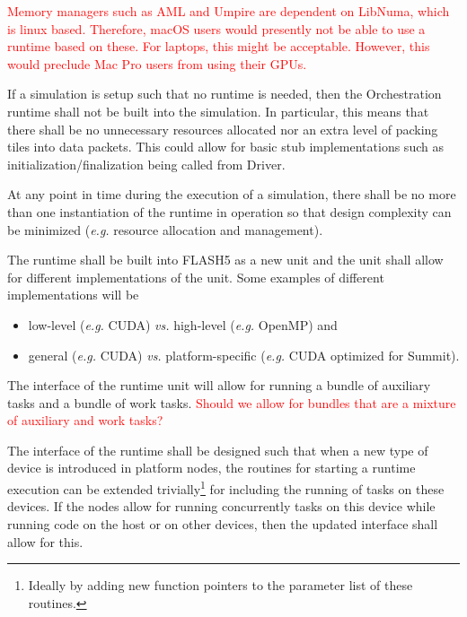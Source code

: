 \documentclass{article}
\begin{document}
\textcolor{red}{Memory managers such as AML and Umpire are dependent on
LibNuma, which is linux based.  Therefore, macOS users would presently not be
able to use a runtime based on these.  For laptops, this might be acceptable.
However, this would preclude Mac Pro users from using their GPUs.}

\begin{req}
If a simulation is setup such that no runtime is needed, then the Orchestration
runtime shall not be built into the simulation.  In particular, this means that
there shall be no unnecessary resources allocated nor an extra level of packing
tiles into data packets.  This could allow for basic stub implementations such
as initialization/finalization being called from Driver.
\end{req}

\begin{req}
At any point in time during the execution of a simulation, there shall be no more
than one instantiation of the runtime in operation so that design complexity can
be minimized (\textit{e.g.} resource allocation and management).
\end{req}

\begin{req}
The runtime shall be built into FLASH5 as a new unit and the unit shall allow
for different implementations of the unit.  Some examples of different
implementations will be
\begin{itemize}
\item{low-level (\textit{e.g.} CUDA) \textit{vs.} high-level
(\textit{e.g.} OpenMP) and}
\item{general (\textit{e.g.} CUDA) \textit{vs.}} platform-specific
(\textit{e.g.} CUDA optimized for Summit).
\end{itemize}
The interface of the runtime unit will allow for running a bundle of auxiliary
tasks and a bundle of work tasks.  \textcolor{red}{Should we allow for bundles
that are a mixture of auxiliary and work tasks?}
\end{req}

\begin{req}
The interface of the runtime shall be designed such  that when a new type of
device is introduced in platform nodes, the routines for starting a runtime
execution can be extended trivially\footnote{Ideally by adding new function
pointers to the parameter list of these routines.} for including the running of
tasks on these devices.  If the nodes allow for running concurrently tasks on
this device while running code on the host or on other devices, then the updated
interface shall allow for this.
\end{req}
\end{document}
